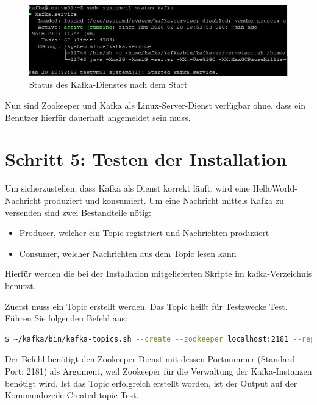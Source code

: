 \documentclass[a4paper,titlepage,halfparskip,12pt]{scrreprt}
\begin{document}
\begin{figure}[h]
	\centering
	\includegraphics{images/StatusKafka}
	\caption{Status des Kafka-Dienstes nach dem Start}
	\label{img:StatusZookeeper}
\end{figure}

Nun sind Zookeeper und Kafka als Linux-Server-Dienst verfügbar ohne, dass ein Benutzer hierfür dauerhaft angemeldet sein muss.

\section{Schritt 5: Testen der Installation}

Um sicherzustellen, dass Kafka als Dienst korrekt läuft, wird eine \glqq HelloWorld\grqq -Nachricht produziert und konsumiert. Um eine Nachricht mittels Kafka zu versenden sind zwei Bestandteile nötig:

\begin{itemize}
\item Producer, welcher ein Topic registriert und Nachrichten produziert
\item Consumer, welcher Nachrichten aus dem Topic lesen kann
\end{itemize}

Hierfür werden die bei der Installation mitgelieferten Skripte im \glqq kafka\grqq -Verzeichnis benutzt.

Zuerst muss ein Topic erstellt werden. Das Topic heißt für Testzwecke \glqq Test\grqq.  Führen Sie folgenden Befehl aus:

\smallskip

\begin{lstlisting}[language=Bash]
$ ~/kafka/bin/kafka-topics.sh --create --zookeeper localhost:2181 --replication-factor 1 --partitions 1 --topic Test
\end{lstlisting}

Der Befehl benötigt den Zookeeper-Dienst mit dessen Portnummer (Standard-Port: 2181) als Argument, weil Zookeeper für die Verwaltung der Kafka-Instanzen benötigt wird. Ist das Topic erfolgreich erstellt worden, ist der Output auf der Kommandozeile \glqq Created topic Test.\grqq
\end{document}

